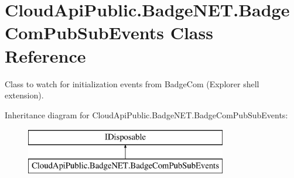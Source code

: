 \hypertarget{class_cloud_api_public_1_1_badge_n_e_t_1_1_badge_com_pub_sub_events}{\section{Cloud\-Api\-Public.\-Badge\-N\-E\-T.\-Badge\-Com\-Pub\-Sub\-Events Class Reference}
\label{class_cloud_api_public_1_1_badge_n_e_t_1_1_badge_com_pub_sub_events}
}


Class to watch for initialization events from Badge\-Com (Explorer shell extension).  


Inheritance diagram for Cloud\-Api\-Public.\-Badge\-N\-E\-T.\-Badge\-Com\-Pub\-Sub\-Events\-:\begin{figure}[H]
\begin{center}
\leavevmode
\includegraphics[height=2.000000cm]{class_cloud_api_public_1_1_badge_n_e_t_1_1_badge_com_pub_sub_events}
\end{center}
\end{figure}
